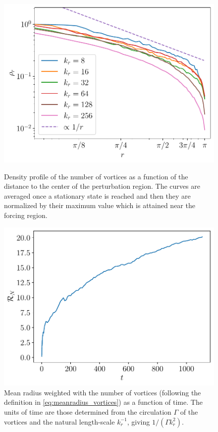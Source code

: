 \documentclass[../main.tex]{subfiles}
\begin{document}
\begin{figure}[ht]
	\centering
	\begin{minipage}[t]{0.44\textwidth}
		\centering
		\includegraphics[width=\textwidth]{images/NumVortices.pdf}
		\caption{Density profile of the number of vortices as a function of the distance to the center of the perturbation region. The curves are averaged once a stationary state is reached and then they are normalized by their maximum value which is attained near the forcing region.
		}\label{fig:numvortices}
	\end{minipage}\hspace{0.04\textwidth}
	\begin{minipage}[t]{0.44\textwidth}
		\centering
		\includegraphics[width=\textwidth]{images/NumVorticesMeanRadius.pdf}
		\caption{Mean radius weighted with the number of vortices (following the definition in \cref{eq:meanradius_vortices}) as a function of time. The units of time are those determined from the circulation $\Gamma$ of the vortices and the natural length-scale $k_r^{-1}$, giving $1/(\Gamma k_r^2)$.}\label{fig:numvortices_meanradius}
	\end{minipage}
\end{figure}
\end{document}
